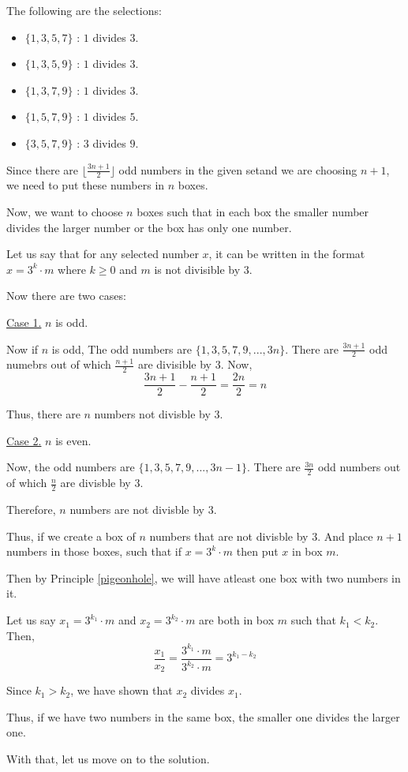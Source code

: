 \begin{scratch}
	The following are the selections:
	\begin{itemize}
	\item $\{1, 3, 5, 7\}$ : $1$ divides $3$.
	\item $\{1, 3, 5, 9\}$ : $1$ divides $3$.
	\item $\{1, 3, 7, 9\}$ : $1$ divides $3$.
	\item $\{1, 5, 7, 9\}$ : $1$ divides $5$.
	\item $\{3, 5, 7, 9\}$ : $3$ divides $9$.
	\end{itemize}

	Since there are $\lfloor \frac{3n+1}{2} \rfloor$ odd numbers in the given setand we are choosing $n+1$, we need to put these numbers in $n$ boxes.

	Now, we want to choose $n$ boxes such that in each box the smaller number divides the larger number or the box has only one number.

	Let us say that for any selected number $x$, it can be written in the format $x = 3^k \cdot m$ where $k \geq 0$ and $m$ is not divisible by $3$.

	Now there are two cases:

	\underline{Case 1.} $n$ is odd.

	Now if $n$ is odd, The odd numbers are $\{1, 3, 5, 7, 9,..., 3n\}$. 
	There are $\frac{3n+1}{2}$ odd numebrs out of which $\frac{n+1}{2}$ are divisible by $3$. Now,
	$$\frac{3n+1}{2} - \frac{n+1}{2} = \frac{2n}{2} = n$$

	Thus, there are $n$ numbers not divisble by $3$.

	\underline{Case 2.} $n$ is even.

	Now, the odd numbers are $\{1, 3, 5, 7, 9, ..., 3n-1\}$.
	There are $\frac{3n}{2}$ odd numbers out of which $\frac{n}{2}$ are divisble by $3$. 

	Therefore, $n$ numbers are not divisble by $3$.

	Thus, if we create a box of $n$ numbers that are not divisble by $3$. 
	And place $n+1$ numbers in those boxes, such that if $x = 3^k \cdot m$ then put $x$ in box $m$.

	Then by Principle \ref{pigeonhole}, we will have atleast one box with two numbers in it. 

	Let us say $x_1 = 3^{k_1} \cdot m$ and $x_2 = 3^{k_2} \cdot m$ are both in box $m$ such that $k_1 < k_2$. Then,
	$$\frac{x_1}{x_2} = \frac{3^{k_1} \cdot m}{3^{k_2} \cdot m} = 3^{k_1-k_2}$$

	Since $k_1 > k_2$, we have shown that $x_2$ divides $x_1$.

	Thus, if we have two numbers in the same box, the smaller one divides the larger one.

	With that, let us move on to the solution.
\end{scratch}

